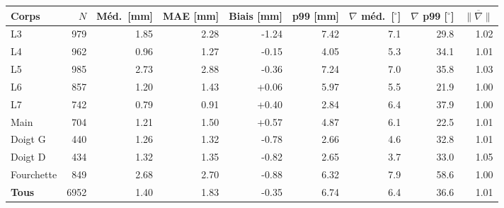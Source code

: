 \begin{tabular}{lrrrrrrrr}
\toprule
Corps & $N$ & Méd.\ [mm] & MAE [mm] & Biais [mm] & p99 [mm] & $\nabla$ méd.\ [$^\circ$] & $\nabla$ p99 [$^\circ$] & $\overline{\|\nabla\|}$ \\
\midrule
L3 & 979 & 1.85 & 2.28 & -1.24 & 7.42 & 7.1 & 29.8 & 1.02 \\
L4 & 962 & 0.96 & 1.27 & -0.15 & 4.05 & 5.3 & 34.1 & 1.01 \\
L5 & 985 & 2.73 & 2.88 & -0.36 & 7.24 & 7.0 & 35.8 & 1.03 \\
L6 & 857 & 1.20 & 1.43 & +0.06 & 5.97 & 5.5 & 21.9 & 1.00 \\
L7 & 742 & 0.79 & 0.91 & +0.40 & 2.84 & 6.4 & 37.9 & 1.00 \\
Main & 704 & 1.21 & 1.50 & +0.57 & 4.87 & 6.1 & 22.5 & 1.01 \\
Doigt G & 440 & 1.26 & 1.32 & -0.78 & 2.66 & 4.6 & 32.8 & 1.01 \\
Doigt D & 434 & 1.32 & 1.35 & -0.82 & 2.65 & 3.7 & 33.0 & 1.05 \\
Fourchette & 849 & 2.68 & 2.70 & -0.88 & 6.32 & 7.9 & 58.6 & 1.00 \\
\midrule
\textbf{Tous} & 6952 & 1.40 & 1.83 & -0.35 & 6.74 & 6.4 & 36.6 & 1.01 \\
\bottomrule
\end{tabular}
